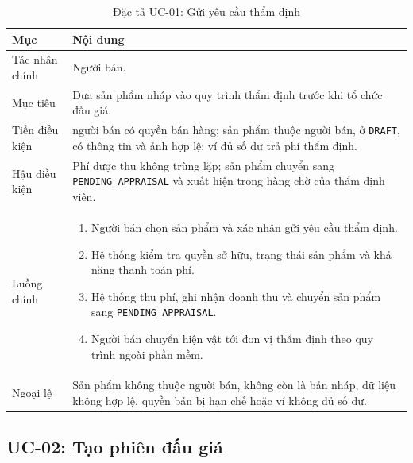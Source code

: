\documentclass[../DoAn.tex]{subfiles}
\begin{document}
\begin{table}[H]
    \centering
    \caption{Đặc tả UC-01: Gửi yêu cầu thẩm định}
    \label{tab:uc-submit-appraisal}
    \footnotesize
    \setlength{\tabcolsep}{4pt}
    \renewcommand{\arraystretch}{1.03}
    \begin{tabular}{|>{\raggedright\arraybackslash}p{}|>{\raggedright\arraybackslash}p{}|}
        \hline
        \textbf{Mục} & \textbf{Nội dung} \\
        \hline
        Tác nhân chính & Người bán. \\
        \hline
        Mục tiêu & Đưa sản phẩm nháp vào quy trình thẩm định trước khi tổ chức đấu giá. \\
        \hline
        Tiền điều kiện & người bán có quyền bán hàng; sản phẩm thuộc người bán, ở \texttt{DRAFT}, có thông tin và ảnh hợp lệ; ví đủ số dư trả phí thẩm định. \\
        \hline
        Hậu điều kiện & Phí được thu không trùng lặp; sản phẩm chuyển sang \texttt{PENDING\_APPRAISAL} và xuất hiện trong hàng chờ của thẩm định viên. \\
        \hline
        Luồng chính &
        \begin{enumerate}[label=\roman*., leftmargin=*, nosep]
            \item Người bán chọn sản phẩm và xác nhận gửi yêu cầu thẩm định.
            \item Hệ thống kiểm tra quyền sở hữu, trạng thái sản phẩm và khả năng thanh toán phí.
            \item Hệ thống thu phí, ghi nhận doanh thu và chuyển sản phẩm sang \texttt{PENDING\_APPRAISAL}.
            \item Người bán chuyển hiện vật tới đơn vị thẩm định theo quy trình ngoài phần mềm.
        \end{enumerate} \\
        \hline
        Ngoại lệ & Sản phẩm không thuộc người bán, không còn là bản nháp, dữ liệu không hợp lệ, quyền bán bị hạn chế hoặc ví không đủ số dư. \\
        \hline
    \end{tabular}
\end{table}
\FloatBarrier

\subsection{UC-02: Tạo phiên đấu giá}
\end{document}
